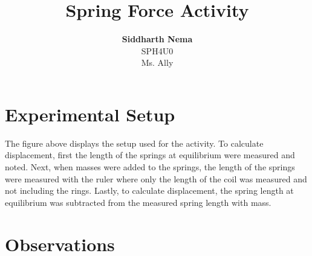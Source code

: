 \documentclass[12pt,letterpaper]{article}
\title{\textbf{Spring Force Activity}}
\author{\textbf{Siddharth Nema}\\SPH4U0 \\Ms.\hspace{-1mm} Ally}
\begin{document}
\maketitle
\newpage
\section{Experimental Setup}


The figure above displays the setup used for the activity.
To calculate displacement, first the length of the springs at equilibrium were measured and noted.
Next, when masses were added to the springs, the length of the springs were measured with the ruler where only the length of the coil was measured and not including the rings.
Lastly, to calculate displacement, the spring length at equilibrium was subtracted from the measured spring length with mass.
\section{Observations}

\newpage
\end{document}
